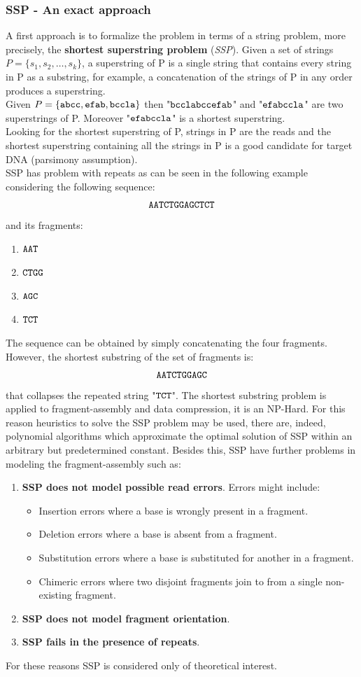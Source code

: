 \subsubsection{SSP - An exact approach}
A first approach is to formalize the problem in terms of a string problem, more precisely, the \textbf{shortest superstring problem} (\textit{SSP}). Given a set of strings $P=\{s_1, s_2, \dots, s_k\}$, a superstring of P is a single string that contains every string in P as a substring, for example, a concatenation of the strings of P in any order produces a superstring.\\
Given $P =\{\verb|abcc|, \verb|efab|, \verb|bccla| \}$ then "$\verb|bcclabccefab|$" and "$\verb|efabccla|$" are two superstrings of P. Moreover "$\verb|efabccla|$" is a shortest superstring.\\
Looking for the shortest superstring of P, strings in P are the reads and the shortest superstring containing all the strings in P is a good candidate for target DNA (parsimony assumption).\\
SSP has problem with repeats as can be seen in the following example considering the following sequence:
$$\verb|AATCTGGAGCTCT|$$
and its fragments:
\begin{enumerate}
	\item $\verb|AAT|$
	\item $\verb|CTGG|$
	\item $\verb|AGC|$
	\item $\verb|TCT|$
\end{enumerate}
The sequence can be obtained by simply concatenating the four fragments. However, the shortest substring of the set of fragments is:
$$\verb|AATCTGGAGC|$$
that collapses the repeated string "$\verb|TCT|$". The shortest substring problem is applied to fragment-assembly and data compression, it is an NP-Hard. For this reason heuristics to solve the SSP problem may be used, there are, indeed, polynomial algorithms which approximate the optimal solution of SSP within an arbitrary but predetermined constant.
Besides this, SSP have further problems in modeling the fragment-assembly such as:
\begin{enumerate}
	\item \textbf{SSP does not model possible read errors}. Errors might include:
	\begin{itemize}
		\item Insertion errors where a base is wrongly present in a fragment.
		\item Deletion errors where a base is absent from a fragment.
		\item Substitution errors where a base is substituted for another in a fragment. \item Chimeric errors where two disjoint fragments join to from a single non-existing fragment.
	\end{itemize}
	\item \textbf{SSP does not model fragment orientation}.
	\item \textbf{SSP fails in the presence of repeats}.
\end{enumerate}
For these reasons SSP is considered only of theoretical interest.

